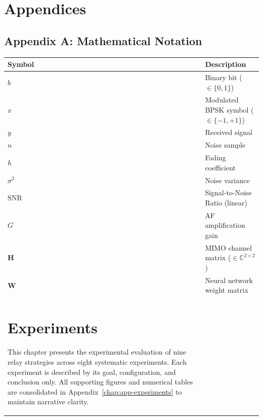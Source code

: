 \chapter{Appendices}\label{sec:appendices}

\section{Appendix A: Mathematical Notation}\label{sec:appendix-a-mathematical-notation}

{\def\LTcaptype{table} %
\begin{longtable}[]{@{}ll@{}}
\toprule\noalign{}
Symbol & Description \\
\midrule\noalign{}
\endhead
\bottomrule\noalign{}
\endlastfoot
\(b\) & Binary bit (\(\in \{0, 1\}\)) \\
\(x\) & Modulated BPSK symbol (\(\in \{-1, +1\}\)) \\
\(y\) & Received signal \\
\(n\) & Noise sample \\
\(h\) & Fading coefficient \\
\(\sigma^2\) & Noise variance \\
\(\text{SNR}\) & Signal-to-Noise Ratio (linear) \\
\(G\) & AF amplification gain \\
\(\mathbf{H}\) & MIMO channel matrix (\(\in \mathbb{C}^{2 \times 2}\)) \\
\(\mathbf{W}\) & Neural network weight matrix \\%
\chapter{Experiments}\label{sec:experiments}

This chapter presents the experimental evaluation of nine relay strategies across eight
systematic experiments. Each experiment is described by its goal, configuration, and
conclusion only. All supporting figures and numerical tables are consolidated in
Appendix~\ref{chap:app-experiments} to maintain narrative clarity.


\end{longtable}}
